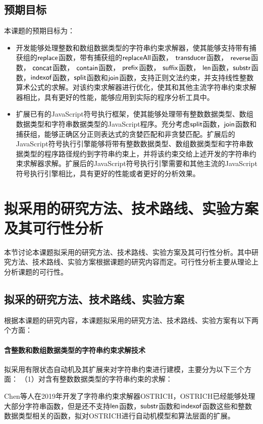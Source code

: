\subsection{预期目标}
本课题的预期目标为：
\begin{itemize}
    \item 开发能够处理整数和数组数据类型的字符串约束求解器，使其能够支持带有捕获组的$\mathsf{replace}$函数，带有捕获组的$\mathsf{replaceAll}$函数， $\mathsf{transducer}$函数， $\mathsf{reverse}$函数， $\mathsf{concat}$函数， $\mathsf{contain}$函数， $\mathsf{prefix}$函数， $\mathsf{suffix}$函数， $\mathsf{len}$函数，$\mathsf{substr}$函数，$\mathsf{indexof}$函数，$\mathsf{split}$函数和$\mathsf{join}$函数，支持正则文法约束，并支持线性整数算术公式的求解。对该约束求解器进行优化，使其和其他主流字符串约束求解器相比，具有更好的性能，能够应用到实际的程序分析工具中。
    \item 扩展已有的JavaScript符号执行框架，使其能够处理带有整数数据类型、数组数据类型和字符串数据类型的JavaScript程序。充分考虑$\mathsf{split}$函数，$\mathsf{join}$函数和捕获组，能够正确区分正则表达式的贪婪匹配和非贪婪匹配。扩展后的JavaScript符号执行引擎能够将带有整数数据类型、数组数据类型和字符串数据类型的程序路径规约到字符串约束上，并将该约束交给上述开发的字符串约束求解器求解。扩展后的JavaScript符号执行引擎需要和其他主流的JavaScript符号执行引擎相比，具有更好的性能或者更好的分析效果。
\end{itemize}

\section{拟采用的研究方法、技术路线、实验方案及其可行性分析}
本节讨论本课题拟采用的研究方法、技术路线、实验方案及其可行性分析。其中研究方法、技术路线、实验方案根据课题的研究内容而定。可行性分析主要从理论上分析课题的可行性。
\subsection{拟采的研究方法、技术路线、实验方案}
根据本课题的研究内容，本课题拟采用的研究方法、技术路线、实验方案有以下两个方面：
\paragraph{含整数和数组数据类型的字符串约束求解技术} 拟采用有限状态自动机及其扩展来对字符串约束进行建模，主要分为以下三个方面：\newline
（1）对含有整数数据类型的字符串约束的求解：

Chen等人在2019年开发了字符串约束求解器OSTRICH\cite{ostrich}，OSTRICH已经能够处理大部分字符串函数，但是还不支持$\mathsf{len}$函数，$\mathsf{substr}$函数和$\mathsf{indexof}$函数这些和整数数据类型相关的函数，拟对OSTRICH进行自动机模型和算法层面的扩展。

